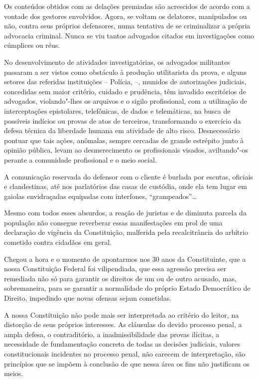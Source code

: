Os conteúdos obtidos com as delações premiadas são acrescidos de acordo
com a vontade dos gestores envolvidos. Agora, se voltam os delatores,
manipulados ou não, contra seus próprios defensores, numa tentativa de
se criminalizar a própria advocacia criminal. Nunca se viu tantos
advogados citados em investigações como cúmplices ou réus.

No desenvolvimento de atividades investigatórias, os advogados
militantes passaram a ser vistos como obstáculo à produção utilitarista
da prova, e alguns setores das referidas instituições -- Polícia,  --,
munidos de autorizações judiciais, concedidas sem maior critério,
cuidado e prudência, têm invadido escritórios de advogados,
violando"-lhes os arquivos e o sigilo profissional, com a utilização de
interceptações epistolares, telefônicas, de dados e telemáticas, na
busca de possíveis indícios ou provas de atos de terceiros,
transformando o exercício da defesa técnica da liberdade humana em
atividade de alto risco. Desnecessário pontuar que tais ações, anômalas,
sempre cercadas de grande estrépito junto à opinião pública, levam ao
desmerecimento os profissionais visados, aviltando"-os perante a
comunidade profissional e o meio social.

A comunicação reservada do defensor com o cliente é burlada por escutas,
oficiais e clandestinas, até nos parlatórios das casas de custódia, onde
ela tem lugar em gaiolas envidraçadas equipadas com interfones,
``grampeados''\ldots{}

Mesmo com todos esses absurdos, a reação de juristas e de diminuta
parcela da população não consegue reverberar essas manifestações em prol
de uma declaração de vigência da Constituição, malferida pela
recalcitrância do arbítrio cometido contra cidadãos em geral.

Chegou a hora e o momento de apontarmos nos 30 anos da Constituinte, que
a nossa Constituição Federal foi vilipendiada, que essa agressão precisa
ser remediada não só para garantir os direitos de um ou de outro
acusado, mas, sobremaneira, para se garantir a normalidade do próprio
Estado Democrático de Direito, impedindo que novas ofensas sejam
cometidas.

A nossa Constituição não pode mais ser interpretada ao critério do
leitor, na distorção de seus próprios interesses. As cláusulas do devido
processo penal, a ampla defesa, o contraditório, a inadmissibilidade das
provas ilícitas, a necessidade de fundamentação concreta de todas as
decisões judiciais, valores constitucionais incidentes no processo
penal, não carecem de interpretação, são princípios que se impõem à
conclusão de que nessa área os fins não justificam os meios.

